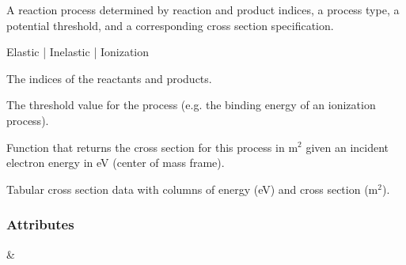 \documentclass[letterpaper,10pt,english,openany,oneside]{sphinxmanual}
\begin{document}
\begin{fulllineitems}
\label{\detokenize{api/pytb.Process:pytb.Process}}
\pysigstartsignatures
{}
\pysigstopsignatures
\sphinxAtStartPar
A reaction process determined by reaction and product indices,
a process type, a potential threshold, and a corresponding cross
section specification.
\begin{description}
\sphinxAtStartPar
Elastic | Inelastic | Ionization

\sphinxAtStartPar
The indices of the reactants and products.

\sphinxAtStartPar
The threshold value for the process (e.g. the binding
energy of an ionization process).

\sphinxAtStartPar
Function that returns the cross section for this process in
\(\mathrm{m}^2\) given an incident electron energy in
eV (center of mass frame).

\sphinxAtStartPar
Tabular cross section data with columns of energy (eV) and cross
section (\(\mathrm{m}^2\)).

\end{description}
\subsubsection*{Attributes}


\begin{savenotes}\sphinxattablestart
\sphinxthistablewithglobalstyle
\sphinxthistablewithnovlinesstyle
\centering
\begin{tabulary}{\linewidth}[t]{}
\sphinxtoprule
\sphinxtableatstartofbodyhook
\sphinxAtStartPar
{}
&
\sphinxAtStartPar


\end{tabulary}
\end{savenotes}
\end{fulllineitems}
\end{document}
